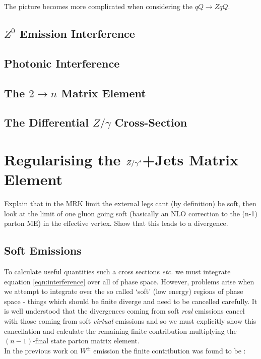 		The picture becomes more complicated when considering the $qQ\to ZqQ$.

	\subsection{$Z^0$ Emission Interference}

	\subsection{Photonic Interference}

	\subsection{The $2\rightarrow n$ Matrix Element}

	\subsection{The Differential ${Z/\gamma}$ Cross-Section}

\section{Regularising the $Z/\gamma^*$+Jets Matrix Element}
	\label{sec:regularising}

	Explain that in the MRK limit the external legs cant (by definition) be soft, then look at the limit
	of one gluon going soft (basically an NLO correction to the (n-1) parton ME) in the effective vertex.
	Show that this leads to a divergence.

	\subsection{Soft Emissions}
		\label{sub:softEmissions}

		To calculate useful quantities such a cross sections \emph{etc.} we must integrate equation
		\eqref{eqn:interference} over all of phase space.  However, problems arise when we attempt to
		integrate over the so called `soft' (low energy) regions of phase space - things which should
		be finite diverge and need to be cancelled carefully.  It is well understood that the divergences
		coming from soft \emph{real} emissions cancel with those coming from soft \emph{virtual} emissions
		and so we must explicitly show this cancellation and calculate the remaining finite contribution
		multiplying the $(n-1)$-final state parton matrix element.\\In the previous work on $W^\pm$
		emission the finite contribution was found to be \cite{JeppeHiggs}\cite{Constructing}:

